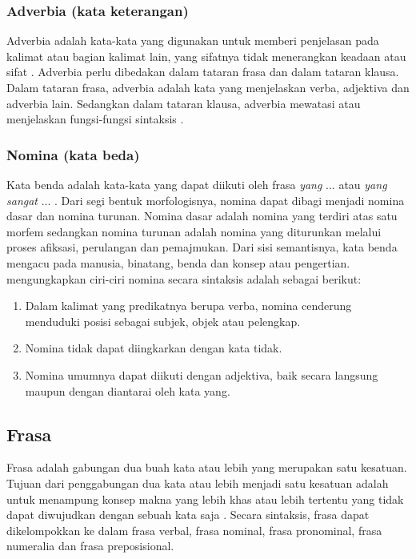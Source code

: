 \subsubsection{Adverbia (kata keterangan)}
Adverbia adalah kata-kata yang digunakan untuk memberi penjelasan pada kalimat atau bagian kalimat lain, yang sifatnya tidak menerangkan keadaan atau sifat \citep{chaer}. Adverbia perlu dibedakan dalam tataran frasa dan dalam tataran klausa. Dalam tataran frasa, adverbia adalah kata yang menjelaskan verba, adjektiva dan adverbia lain. Sedangkan dalam tataran klausa, adverbia mewatasi atau menjelaskan fungsi-fungsi sintaksis \citep{alwi}.

\subsubsection{Nomina (kata beda)}
Kata benda adalah kata-kata yang dapat diikuti oleh frasa \emph{yang} ... atau \emph{yang sangat} ... \citep{chaer}. Dari segi bentuk morfologisnya, nomina dapat dibagi menjadi nomina dasar dan nomina turunan. Nomina dasar adalah nomina yang terdiri atas satu morfem sedangkan nomina turunan adalah nomina yang diturunkan melalui proses afiksasi, perulangan dan pemajmukan. Dari sisi semantisnya, kata benda mengacu pada manusia, binatang, benda dan konsep atau pengertian. \citet{alwi} mengungkapkan ciri-ciri nomina secara sintaksis adalah sebagai berikut:
\begin{enumerate}
	\item Dalam kalimat yang predikatnya berupa verba, nomina cenderung menduduki posisi sebagai subjek, objek atau pelengkap.
	
	\item Nomina tidak dapat diingkarkan dengan kata tidak.
	
	\item Nomina umumnya dapat diikuti dengan adjektiva, baik secara langsung maupun dengan diantarai oleh kata yang.
\end{enumerate}

\subsection{Frasa}
Frasa adalah gabungan dua buah kata atau lebih yang merupakan satu kesatuan. Tujuan dari penggabungan dua kata atau lebih menjadi satu kesatuan adalah untuk menampung konsep makna yang lebih khas atau lebih tertentu yang tidak dapat diwujudkan dengan sebuah kata saja \citep{chaer}. Secara sintaksis, frasa dapat dikelompokkan ke dalam frasa verbal, frasa nominal, frasa pronominal, frasa numeralia dan frasa preposisional. 

